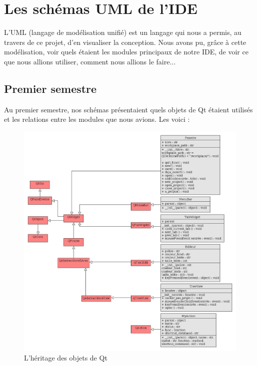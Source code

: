 \documentclass[a4paper,12pt]{article}
\begin{document}
\section{Les schémas UML de l'IDE}

L'UML (langage de modélisation unifié) est un langage qui nous a permis, au travers de ce projet, d'en visualiser la conception. Nous avons pu, grâce à cette modélisation, voir quels étaient les modules principaux de notre IDE, de voir ce que nous allions utiliser, comment nous allions le faire...

	\subsection{Premier semestre}
	
	Au premier semestre, nos schémas présentaient quels objets de Qt étaient utilisés et les relations entre les modules que nous avions. Les voici :
	
	\begin{figure}[h!]
			\begin{center}
				\includegraphics[scale=0.35]{images/imgs_uml/uml_module_gui_heritage.jpg}
				\caption{L'héritage des objets de Qt}
			\end{center}
	\end{figure}
\end{document}
